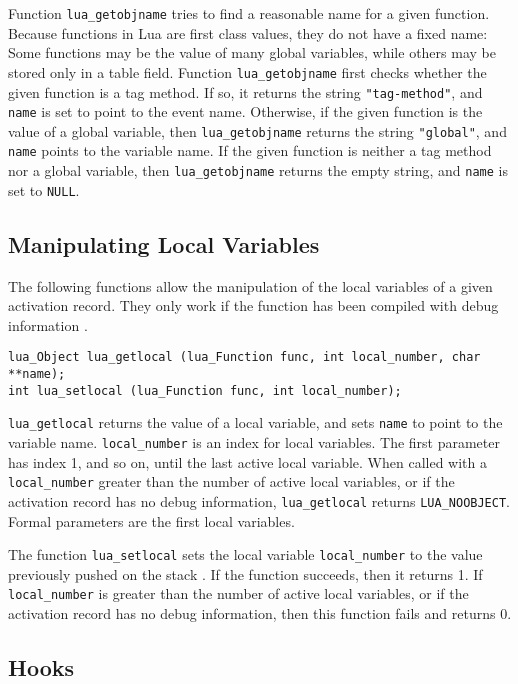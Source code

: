 Function \verb|lua_getobjname| tries to find a reasonable name for
a given function.
Because functions in Lua are first class values,
they do not have a fixed name:
Some functions may be the value of many global variables,
while others may be stored only in a table field.
Function \verb|lua_getobjname| first checks whether the given
function is a tag method.
If so, it returns the string \verb|"tag-method"|,
and \verb|name| is set to point to the event name.
Otherwise, if the given function is the value of a global variable,
then \verb|lua_getobjname| returns the string \verb|"global"|,
and \verb|name| points to the variable name.
If the given function is neither a tag method nor a global variable,
then \verb|lua_getobjname| returns the empty string,
and \verb|name| is set to \verb|NULL|.

\subsection{Manipulating Local Variables}

The following functions allow the manipulation of the
local variables of a given activation record.
They only work if the function has been compiled with debug
information .
\begin{verbatim}
lua_Object lua_getlocal (lua_Function func, int local_number, char **name);
int lua_setlocal (lua_Function func, int local_number);
\end{verbatim}
\verb|lua_getlocal| returns the value of a local variable,
and sets \verb|name| to point to the variable name.
\verb|local_number| is an index for local variables.
The first parameter has index 1, and so on, until the
last active local variable.
When called with a \verb|local_number| greater than the
number of active local variables,
or if the activation record has no debug information,
\verb|lua_getlocal| returns \verb|LUA_NOOBJECT|.
Formal parameters are the first local variables.

The function \verb|lua_setlocal| sets the local variable
\verb|local_number| to the value previously pushed on the stack
.
If the function succeeds, then it returns 1.
If \verb|local_number| is greater than the number
of active local variables,
or if the activation record has no debug information,
then this function fails and returns 0.

\subsection{Hooks}

